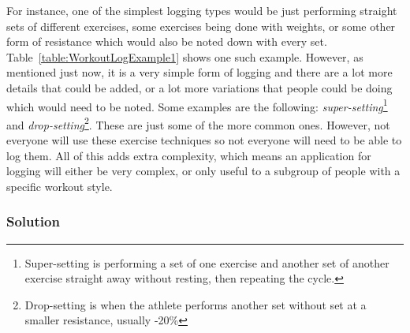 \documentclass{article}
\newcommand{\vspaceconst}{-2ex}
\begin{document}
\begin{multicols}{2}
For instance, one of the simplest logging types would be just performing straight sets of different exercises, some exercises being done with weights, or some other form of resistance which would also be noted down with every set. Table~\ref{table:WorkoutLogExample1} shows one such example. However, as mentioned just now, it is a very simple form of logging and there are a lot more details that could be added, or a lot more variations that people could be doing which would need to be noted. Some examples are the following: \textit{super-setting}\footnote{Super-setting is performing a set of one exercise and another set of another exercise straight away without resting, then repeating the cycle.} and \textit{drop-setting}\footnote{Drop-setting is when the athlete performs another set without set at a smaller resistance, usually -20\%}. These are just some of the more common ones. However, not everyone will use these exercise techniques so not everyone will need to be able to log them. All of this adds extra complexity, which means an application for logging will either be very complex, or only useful to a subgroup of people with a specific workout style.\\

\subsubsection{Solution}
\vspace{\vspaceconst}
 

\end{multicols}
\end{document}
